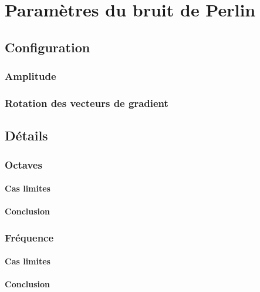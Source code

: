 \chapter{Paramètres du bruit de Perlin}

\section{Configuration}

\subsection{Amplitude}

\subsection{Rotation des vecteurs de gradient}

\section{Détails}

\subsection{Octaves}

\subsubsection{Cas limites}

\subsubsection{Conclusion}

\subsection{Fréquence}

\subsubsection{Cas limites}

\subsubsection{Conclusion}



